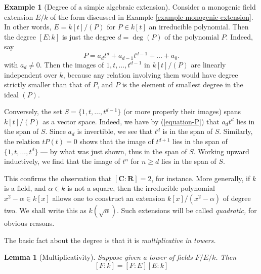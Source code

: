 \documentclass{stacks-project}
\theoremstyle{plain}
\newtheorem{lemma}[subsection]{Lemma}
\theoremstyle{definition}
\newtheorem{example}[subsection]{Example}
\theoremstyle{remark}
\numberwithin{equation}{subsection}
\begin{document}
\begin{example}[Degree of a simple algebraic extension]
\label{example-degree-simple-algebraic-extension}
Consider a monogenic field extension $E/k$ of the form discussed in
Example \ref{example-monogenic-extension}.
In other words, $E = k[t]/(P)$ for $P \in k[t]$ an irreducible polynomial.
Then the degree $[E : k]$ is just the degree $d = \deg(P)$ of the
polynomial $P$. Indeed, say
\begin{equation}
\label{equation-P}
P = a_d t^d + a_{d - 1} t^{d - 1} + \ldots + a_0.
\end{equation}
with $a_d \not = 0$. Then the images of $1, t, \ldots, t^{d - 1}$ in
$k[t]/(P)$ are linearly independent over $k$, because any relation involving
them would have degree strictly smaller than that of $P$, and $P$ is the
element of smallest degree in the ideal $(P)$.

\medskip\noindent
Conversely, the set $S = \{1, t, \ldots, t^{d - 1}\}$ (or more
properly their images) spans $k[t]/(P)$ as a vector space.
Indeed, we have by (\ref{equation-P}) that $a_d t^d$ lies in the span of $S$.
Since $a_d$ is invertible, we see that $t^d$ is in the span of $S$.
Similarly, the relation $t P(t) = 0$ shows that the image of $t^{d + 1}$
lies in the span of $\{1, t, \ldots, t^d\}$ --- by what was just shown, thus
in the span of $S$. Working upward inductively, we find
that the image of $t^n$ for $n \geq d$ lies in the span of $S$.
\end{example}

\noindent
This confirms the observation that $[\mathbf{C}: \mathbf{R}] = 2$, for
instance. More generally, if $k$ is a field, and $\alpha \in k$ is not a
square, then the irreducible polynomial $x^2 - \alpha \in k[x]$ allows one
to construct an extension $k[x]/(x^2 - \alpha)$ of degree two.
We shall write this as $k(\sqrt{\alpha})$. Such extensions will be called
{\it quadratic,} for obvious reasons.

\medskip\noindent
The basic fact about the degree is that it is {\it multiplicative in towers.}

\begin{lemma}[Multiplicativity]
\label{lemma-multiplicativity-degrees}
Suppose given a tower of fields $F/E/k$. Then
$$
[F:k] = [F:E][E:k]
$$
\end{lemma}
\end{document}
